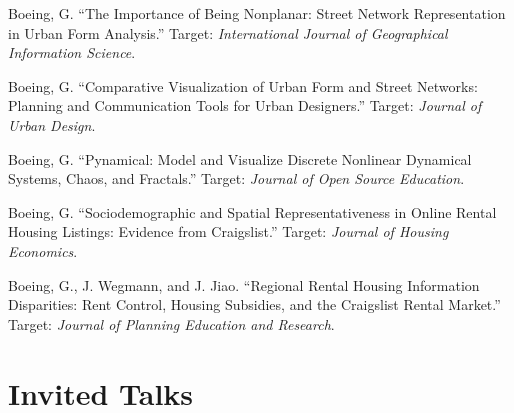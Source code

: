\documentclass{academiccv}
\begin{document}
\begin{tablist}
	
	\item[\the\year] \tab Boeing, G. \enquote{The Importance of Being Nonplanar: Street Network Representation in Urban Form Analysis.} Target: \emph{International Journal of Geographical Information Science}.
	
	\item[\the\year] \tab Boeing, G. \enquote{Comparative Visualization of Urban Form and Street Networks: Planning and Communication Tools for Urban Designers.} Target: \emph{Journal of Urban Design}.
	
	\item[\the\year] \tab Boeing, G. \enquote{Pynamical: Model and Visualize Discrete Nonlinear Dynamical Systems, Chaos, and Fractals.} Target: \emph{Journal of Open Source Education}.
	
	\item[\the\year] \tab Boeing, G. \enquote{Sociodemographic and Spatial Representativeness in Online Rental Housing Listings: Evidence from Craigslist.} Target: \emph{Journal of Housing Economics}.
	
	\item[\the\year] \tab Boeing, G., J. Wegmann, and J. Jiao. \enquote{Regional Rental Housing Information Disparities: Rent Control, Housing Subsidies, and the Craigslist Rental Market.} Target: \emph{Journal of Planning Education and Research}.
	
\end{tablist}



\section*{Invited Talks}
\end{document}
